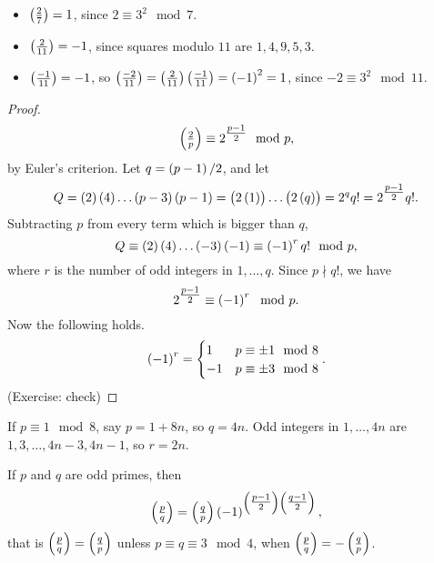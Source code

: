 \begin{example*}
\hfill
\begin{itemize}
\item $ \jacobi{2}{7} = 1 $, since $ 2 \equiv 3^2 \mod 7 $.
\item $ \jacobi{2}{11} = -1 $, since squares modulo $ 11 $ are $ 1, 4, 9, 5, 3 $.
\item $ \jacobi{-1}{11} = -1 $, so $ \jacobi{-2}{11} = \jacobi{2}{11}\jacobi{-1}{11} = \br{-1}^2 = 1 $, since $ -2 \equiv 3^2 \mod 11 $.
\end{itemize}
\end{example*}

\begin{proof}
$$ \jacobi{2}{p} \equiv 2^{\tfrac{p - 1}{2}} \mod p, $$
by Euler's criterion. Let $ q = \br{p - 1} / 2 $, and let
$$ Q = \br{2}\br{4} \dots \br{p - 3}\br{p - 1} = \br{2\br{1}} \dots \br{2\br{q}} = 2^qq! = 2^{\tfrac{p - 1}{2}}q!. $$
Subtracting $ p $ from every term which is bigger than $ q $,
$$ Q \equiv \br{2}\br{4} \dots \br{-3}\br{-1} \equiv \br{-1}^rq! \mod p, $$
where $ r $ is the number of odd integers in $ 1, \dots, q $. Since $ p \nmid q! $, we have
$$ 2^{\tfrac{p - 1}{2}} \equiv \br{-1}^r \mod p. $$
Now the following holds.
$$ \br{-1}^r =
\begin{cases}
1 & p \equiv \pm 1 \mod 8 \\
-1 & p \equiv \pm 3 \mod 8
\end{cases}.
$$
(Exercise: check)
\end{proof}

\begin{example*}
If $ p \equiv 1 \mod 8 $, say $ p = 1 + 8n $, so $ q = 4n $. Odd integers in $ 1, \dots, 4n $ are $ 1, 3, \dots, 4n - 3, 4n - 1 $, so $ r = 2n $.
\end{example*}

\begin{theorem}
\label{thm:40}
If $ p $ and $ q $ are odd primes, then
$$ \jacobi{p}{q} = \jacobi{q}{p}\br{-1}^{\br{\tfrac{p - 1}{2}}\br{\tfrac{q - 1}{2}}}, $$
that is $ \jacobi{p}{q} = \jacobi{q}{p} $ unless $ p \equiv q \equiv 3 \mod 4 $, when $ \jacobi{p}{q} = -\jacobi{q}{p} $.
\end{theorem}

\pagebreak

